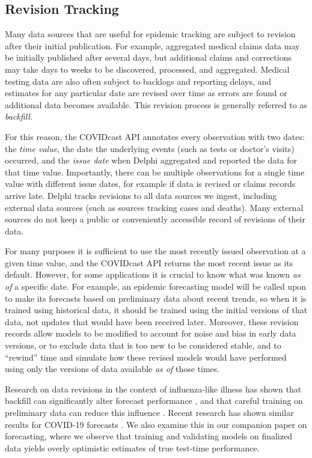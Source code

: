 \documentclass[9pt,twocolumn,twoside,lineno]{pnas-new}
\begin{document}
\subsection{Revision Tracking}
\label{subsec:revision_tracking}

Many data sources that are useful for epidemic tracking are subject to revision
after their initial publication. For example, aggregated medical claims data may
be initially published after several days, but additional claims and corrections
may take days to weeks to be discovered, processed, and aggregated. Medical
testing data are also often subject to backlogs and reporting delays, and
estimates for any particular date are revised over time as errors are found or
additional data becomes available. This revision process is generally referred
to as \textit{backfill}.

For this reason, the COVIDcast API annotates every observation with two dates:
the \textit{time value}, the date the underlying events (such as tests or
doctor's visits) occurred, and the \textit{issue date} when Delphi aggregated
and reported the data for that time value. Importantly, there can be multiple
observations for a single time value with different issue dates, for example if
data is revised or claims records arrive late. Delphi tracks revisions to all
data sources we ingest, including external data sources (such as sources
tracking cases and deaths). Many external sources do not keep a public or
conveniently accessible record of revisions of their data.

For many purposes it is sufficient to use the most recently issued observation
at a given time value, and the COVIDcast API returns the most recent issue as
its default. However, for some applications it is crucial to know what was known
\textit{as of} a specific date. For example, an epidemic forecasting model will
be called upon to make its forecasts based on preliminary data about recent
trends, so when it is trained using historical data, it should be trained using
the initial versions of that data, not updates that would have been received
later. Moreover, these revision records allow models to be modified to account
for noise and bias in early data versions, or to exclude data that is too new to
be considered stable, and to ``rewind'' time and simulate how these revised
models would have performed using only the versions of data available \textit{as
  of} those times.

Research on data revisions in the context of influenza-like illness has shown
that backfill can significantly alter forecast performance \cite{Brooks:2018,
  Reich:2019}, and that careful training on preliminary data can reduce this
influence \cite{Brooks:2020}. Recent research has shown similar results for
COVID-19 forecasts \cite{Kamarthi:2021}. We also examine this in our companion
paper on forecasting, where we observe that training and validating models on
finalized data yields overly optimistic estimates of true test-time
performance.
\end{document}
